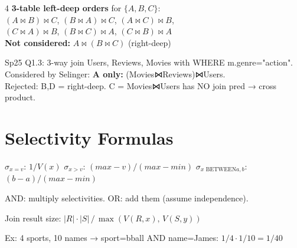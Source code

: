 \documentclass[8pt,letterpaper]{article}
\newcommand{\codefont}{\fontsize{4.2}{4.8}\selectfont\ttfamily}
\newcommand{\key}[1]{\textbf{\color{red!70!black}#1}}
\newcommand{\warn}[1]{\textbf{\color{orange!85!black}#1}}
\newcommand{\sql}[1]{{\codefont #1}}
\newcommand{\sel}{\ensuremath{\sigma}}
\newcommand{\jn}{\ensuremath{\bowtie}}
\begin{document}
\begin{multicols*}{4}
\key{3-table left-deep orders} for $\{A,B,C\}$:\\
$(A\jn B)\jn C$, $(B\jn A)\jn C$, $(A\jn C)\jn B$,\\
$(C\jn A)\jn B$, $(B\jn C)\jn A$, $(C\jn B)\jn A$\\
\warn{Not considered:} $A\jn(B\jn C)$ (right-deep)

\begin{ansbox}
Sp25 Q1.3: 3-way join Users, Reviews, Movies with WHERE m.genre="action". Considered by Selinger: \textbf{A only:} (Movies⋈Reviews)⋈Users.\\
Rejected: B,D = right-deep. C = Movies⋈Users has NO join pred → cross product.
\end{ansbox}

\section{Selectivity Formulas}
$\sel_{x=v}$: $1/V(x)$ \quad $\sel_{x>v}$: $(max-v)/(max-min)$ \quad $\sel_{x\text{ BETWEEN}a,b}$: $(b-a)/(max-min)$

AND: multiply selectivities. OR: add them (assume independence).

Join result size: $|R|\cdot|S|\,/\,\max(V(R,x),\,V(S,y))$

Ex: 4 sports, 10 names → \sql{sport=bball AND name=James}: $1/4 \cdot 1/10 = 1/40$

\end{multicols*}
\newpage
\end{document}
